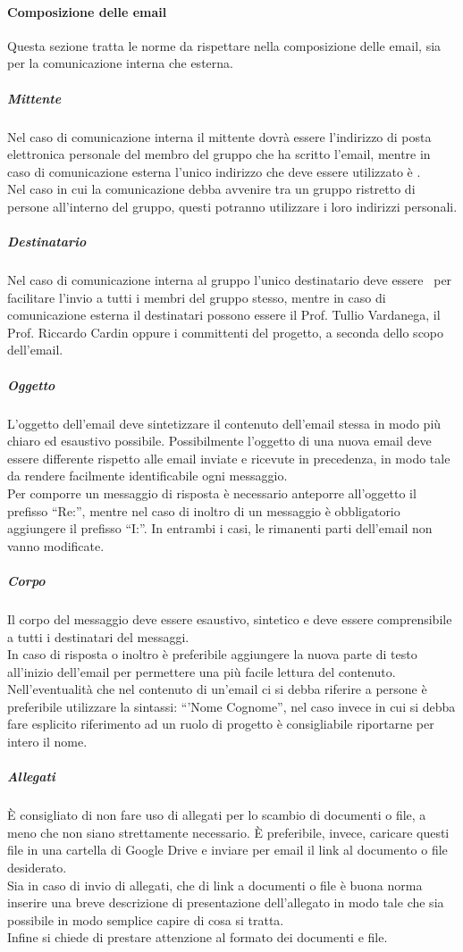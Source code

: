 \documentclass[../NormeProgetto.tex]{subfiles}
\begin{document}
			\paragraph{Composizione delle email}
			Questa sezione tratta le norme da rispettare nella composizione delle email, sia per la comunicazione interna che esterna.
			\subparagraph{Mittente}
			Nel caso di comunicazione interna il mittente dovrà essere l'indirizzo di posta elettronica personale del membro del gruppo che ha scritto l'email, mentre in caso di comunicazione esterna l'unico indirizzo che deve essere utilizzato è \mailleaf. \\ Nel caso in cui la comunicazione debba avvenire tra un gruppo ristretto di persone all'interno del gruppo, questi potranno utilizzare i loro indirizzi personali.
			\subparagraph{Destinatario}
			Nel caso di comunicazione interna al gruppo l'unico destinatario deve essere \mailinglist\ per facilitare l'invio a tutti i membri del gruppo stesso, mentre in caso di comunicazione esterna il destinatari possono essere il Prof. Tullio Vardanega, il Prof. Riccardo Cardin oppure i committenti del progetto, a seconda dello scopo dell'email.
			\subparagraph{Oggetto}
			L'oggetto dell'email deve sintetizzare il contenuto dell'email stessa in modo più chiaro ed esaustivo possibile. Possibilmente l'oggetto di una nuova email deve essere differente rispetto alle email inviate e ricevute in precedenza, in modo tale da rendere facilmente identificabile ogni messaggio. \\ Per comporre un messaggio di risposta è necessario anteporre all'oggetto il prefisso ``Re:'', mentre nel caso di inoltro di un messaggio è obbligatorio aggiungere il prefisso ``I:''. In entrambi i casi, le rimanenti parti dell'email non vanno modificate.
			\subparagraph{Corpo}
			Il corpo del messaggio deve essere esaustivo, sintetico e deve essere comprensibile a tutti i destinatari del messaggi. \\ In caso di risposta o inoltro è preferibile aggiungere la nuova parte di testo all'inizio dell'email per permettere una più facile lettura del contenuto. \\ Nell'eventualità che nel contenuto di un'email ci si debba riferire a persone è preferibile utilizzare la sintassi: ``'Nome Cognome'', nel caso invece in cui si debba fare esplicito riferimento ad un ruolo di progetto è consigliabile riportarne per intero il nome.
			\subparagraph{Allegati}
			È consigliato di non fare uso di allegati per lo scambio di documenti o file, a meno che non siano strettamente necessario. È preferibile, invece, caricare questi file in una cartella di Google Drive e inviare per email il link al documento o file desiderato. \\ Sia in caso di invio di allegati, che di link a documenti o file è buona norma inserire una breve descrizione di presentazione dell'allegato in modo tale che sia possibile in modo semplice capire di cosa si tratta. \\ Infine si chiede di prestare attenzione al formato dei documenti e file.
\end{document}
